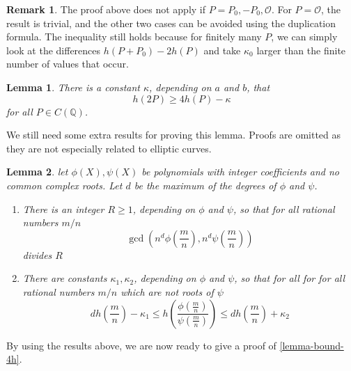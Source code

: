\documentclass[12pt]{article}
\newtheorem{lemma}{Lemma}[subsection]
\theoremstyle{remark}
\theoremstyle{definition}
\newtheorem{remark}{Remark}[subsection]
\begin{document}
        \begin{remark}
            The proof above does not apply if $P = P_0, -P_0,\mathcal{O}$. For $P=\mathcal{O}$, the result is trivial, and the other two cases can be avoided using the duplication formula. The inequality still holds because for finitely many $P$, we can simply look at the differences $h(P + P_0) - 2h(P)$ and take $\kappa_0$ larger than the finite number of values that occur.
        \end{remark}
        \begin{lemma}\label{lemma-bound-4h}
            There is a constant $\kappa$, depending on $a$ and $b$, that
            $$h(2P)\geqslant 4h(P)-\kappa$$
            for all $P\in C(\mathbb{Q})$.
        \end{lemma}
        We still need some extra results for proving this lemma. Proofs are omitted as they are not especially related to elliptic curves.
        \begin{lemma}\label{lemma_mordell_assump2}
        let $\phi(X),\psi(X)$ be polynomials with integer coefficients and no common complex roots. Let $d$ be the maximum of the degrees of $\phi$ and $\psi$.
        \begin{enumerate}[\normalfont(i)]
             \item There is an integer $R \geq 1$, depending on  $\phi$ and $\psi$, so that for all rational numbers $m/n$
             $$\gcd\left(n^d\phi\left(\frac{m}{n}\right),n^d\psi\left(\frac{m}{n}\right)\right)$$ divides $R$
             
             \item There are constants $\kappa_1,\kappa_2$, depending on $\phi$ and $\psi$, so that for all for for all rational numbers $m/n$ which are not roots of $\psi$
             $$dh\left(\frac{m}{n}\right)-\kappa_1 \leqslant h\left(\frac{\phi\left(\frac{m}{n}\right)}{\psi\left(\frac{m}{n}\right)}\right) \leqslant dh\left(\frac{m}{n}\right)+\kappa_2$$
        \end{enumerate}
        \end{lemma}
        By using the results above, we are now ready to give a proof of \autoref{lemma-bound-4h}.
        
\end{document}
